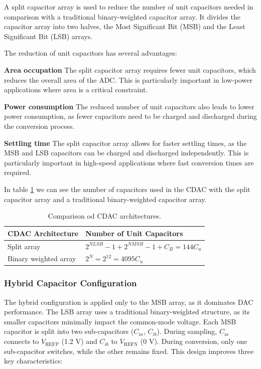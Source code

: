 A split capacitor array is used to reduce the number of unit capacitors needed in comparison with a traditional binary-weighted capacitor array. It divides the capacitor array into two halves, the Most Significant Bit (MSB) and the Least Significant Bit (LSB) arrays. 

The reduction of unit capacitors has several advantages:

\textbf{Area occupation}
The split capacitor array requires fewer unit capacitors, which reduces the overall area of the ADC. This is particularly important in low-power applications where area is a critical constraint.

\textbf{Power consumption}
The reduced number of unit capacitors also leads to lower power consumption, as fewer capacitors need to be charged and discharged during the conversion process.

\textbf{Settling time}
The split capacitor array allows for faster settling times, as the MSB and LSB capacitors can be charged and discharged independently. This is particularly important in high-speed applications where fast conversion times are required.

In table \ref{tab:cap-numbers} we can see the number of capacitors used in the CDAC with the split capacitor array and a traditional binary-weighted capacitor array.

\begin{table}[h]
    \centering
    \caption{Comparison od CDAC architectures.}
    \begin{tabularx}{\textwidth}{>{\centering\arraybackslash}X >{\centering\arraybackslash}X}
        \toprule
        \textbf{CDAC Architecture} & \textbf{Number of Unit Capacitors} \\
        \midrule
        Split array & $2^{NLSB} -1 + 2^{NMSB} - 1 + C_B = 144C_u$\\
        \midrule
        Binary weighted array & $2^N = 2^{12} = 4095C_u$ \\
        \bottomrule
    \end{tabularx}
    \label{tab:cap-numbers}
\end{table}

\subsubsection{Hybrid Capacitor Configuration}  
The hybrid configuration is applied only to the MSB array, as it dominates DAC performance. The LSB array uses a traditional binary-weighted structure, as its smaller capacitors minimally impact the common-mode voltage. Each MSB capacitor is split into two sub-capacitors ($C_{ia}$, $C_{ib}$). During sampling, $C_{ia}$ connects to $V_{\text{REFP}}$ (1.2 V) and $C_{ib}$ to $V_{\text{REFN}}$ (0 V). During conversion, only one sub-capacitor switches, while the other remains fixed. This design improves three key characteristics:  

